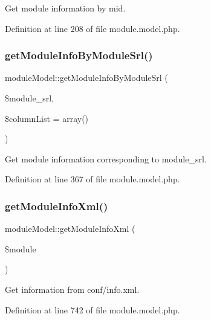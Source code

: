 Get module information by mid. 



Definition at line 208 of file module.\+model.\+php.

\mbox{\label{classmoduleModel_aa31240372b98008ff8a2ad689535d3a9}} 
\subsubsection{\texorpdfstring{get\+Module\+Info\+By\+Module\+Srl()}{getModuleInfoByModuleSrl()}}
{\footnotesize\ttfamily module\+Model\+::get\+Module\+Info\+By\+Module\+Srl (\begin{DoxyParamCaption}\item[{}]{\$module\+\_\+srl,  }\item[{}]{\$column\+List = {\ttfamily array()} }\end{DoxyParamCaption})}



Get module information corresponding to module\+\_\+srl. 



Definition at line 367 of file module.\+model.\+php.

\mbox{\label{classmoduleModel_ae4e9287674bddc605dfc4cef77f8c1bb}} 
\subsubsection{\texorpdfstring{get\+Module\+Info\+Xml()}{getModuleInfoXml()}}
{\footnotesize\ttfamily module\+Model\+::get\+Module\+Info\+Xml (\begin{DoxyParamCaption}\item[{}]{\$module }\end{DoxyParamCaption})}



Get information from conf/info.\+xml. 



Definition at line 742 of file module.\+model.\+php.

\mbox{\label{classmoduleModel_af51708f2ce0243f482bc92a453dd27c4}} 

